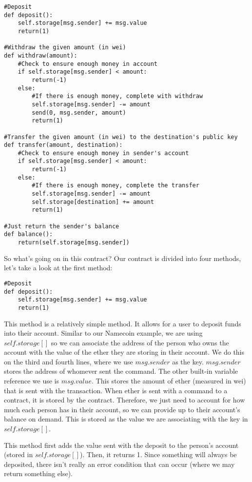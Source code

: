 \documentclass[12pt]{article}
\begin{document}
\begin{mdframed}
\begin{verbatim}
#Deposit
def deposit():
	self.storage[msg.sender] += msg.value
	return(1)

#Withdraw the given amount (in wei)
def withdraw(amount):
	#Check to ensure enough money in account
	if self.storage[msg.sender] < amount:
		return(-1)
	else:
		#If there is enough money, complete with withdraw
		self.storage[msg.sender] -= amount
		send(0, msg.sender, amount)
		return(1)

#Transfer the given amount (in wei) to the destination's public key
def transfer(amount, destination):
	#Check to ensure enough money in sender's account
	if self.storage[msg.sender] < amount:
		return(-1)
	else:
		#If there is enough money, complete the transfer
		self.storage[msg.sender] -= amount
		self.storage[destination] += amount
		return(1)

#Just return the sender's balance
def balance():
	return(self.storage[msg.sender])
\end{verbatim}
\end{mdframed}
		
So what's going on in this contract?
Our contract is divided into four methods, let's take a look at the first method:

\begin{verbatim}
#Deposit
def deposit():
	self.storage[msg.sender] += msg.value
	return(1)
\end{verbatim}

This method is a relatively simple method. It allows for a user to deposit funds into their account. Similar to our Namecoin example, we are using $self.storage[]$ so we can associate the address of the person who owns the account with the value of the ether they are storing in their account. We do this on the third and fourth lines, where we use $msg.sender$ as the key. $msg.sender$ stores the address of whomever sent the command. The other built-in variable reference we use is $msg.value$. This stores the amount of ether (measured in wei) that is sent with the transaction. When ether is sent with a command to a contract, it is stored by the contract. Therefore, we just need to account for how much each person has in their account, so we can provide up to their account's balance on demand. This is stored as the value we are associating with the key in $self.storage[]$.
 
This method first adds the value sent with the deposit to the person's account (stored in $self.storage[]$). Then, it returns 1. Since something will always be deposited, there isn't really an error condition that can occur (where we may return something else). 
\end{document}
